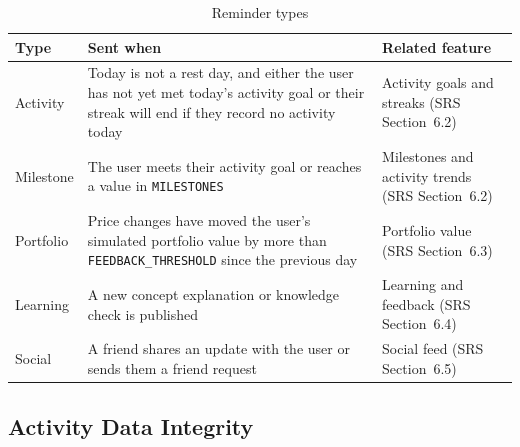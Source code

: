 \documentclass{article}
\begin{document}
\begin{table}[H]
\centering
\caption{Reminder types}
\label{TblReminderTypes}
\begin{tabularx}{\textwidth}{lXX}
\toprule
\textbf{Type} & \textbf{Sent when} & \textbf{Related feature}\\
\midrule
Activity & Today is not a rest day, and either the user has not yet met today's activity goal or their streak will end if they record no activity today & Activity goals and streaks (SRS Section~6.2)\\
Milestone & The user meets their activity goal or reaches a value in \texttt{MILESTONES} & Milestones and activity trends (SRS Section~6.2)\\
Portfolio & Price changes have moved the user's simulated portfolio value by more than \texttt{FEEDBACK\_THRESHOLD} since the previous day & Portfolio value (SRS Section~6.3)\\
Learning & A new concept explanation or knowledge check is published & Learning and feedback (SRS Section~6.4)\\
Social & A friend shares an update with the user or sends them a friend request & Social feed (SRS Section~6.5)\\
\bottomrule
\end{tabularx}
\end{table}

\subsection{Activity Data Integrity}
\end{document}
